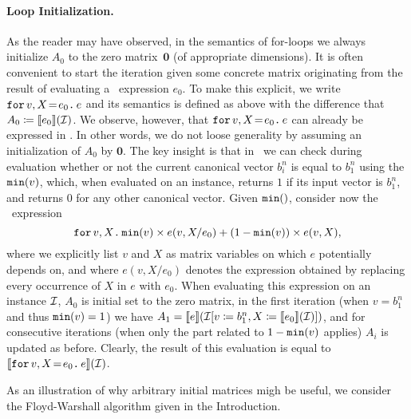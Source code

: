 \paragraph{Loop Initialization.} As the reader may have observed, in the semantics of for-loops we 
always initialize $A_0$ to the zero matrix~$\mathbf{0}$ (of appropriate dimensions). It is often convenient
to start the iteration given some concrete matrix  originating from the result of evaluating a \langfor\ expression $e_0$. To make this explicit, we write $\initf{e_0}{v}{X}{e}$ and its semantics is defined as above
with the difference that $A_0\coloneqq \sem{e_0}{\I}$. We observe, however, that $\initf{e_0}{v}{X}{e}$ can already
be expressed in \langfor. In other words, we do not loose generality by assuming an initialization of $A_0$ by $\mathbf{0}$.
The key insight is that in \langfor\ we can check during evaluation whether or not
the current canonical vector $b_i^n$ is equal to $b_1^n$ using the
$\mmin{v}$, which, when evaluated on an instance, returns $1$ if its input vector is $b_1^n$, and returns $0$ for any other canonical vector. Given $\mmin$, consider now the
\langfor\ expression
 $$\ffor{v}{X}{\mmin{v}\times e(v,X/e_0) + (1-\mmin{v})\times e(v,X)},$$
 where we explicitly list $v$ and $X$ as matrix variables on which $e$ potentially depends on, and where
 $e(v,X/e_0)$ denotes the expression obtained by replacing every occurrence of $X$ in $e$ with $e_0$.
When evaluating this expression on an instance $\I$, $A_0$ is initial set to the zero matrix, in the first iteration (when  $v=b_1^n$ and thus $\mmin{v}=1$)
we have $A_1=\sem{e}{\I[v\coloneqq b_1^n,X\coloneqq \sem{e_0}{\I}]}$, and for consecutive iterations (when only the part related to $1-\mmin{v}$ applies) $A_i$ is updated as before. Clearly, the result of this evaluation is equal to
$\sem{\initf{e_0}{v}{X}{e}}{\I}$.


As an illustration of why arbitrary initial matrices migh be useful, we consider the Floyd-Warshall algorithm given in the Introduction. 

